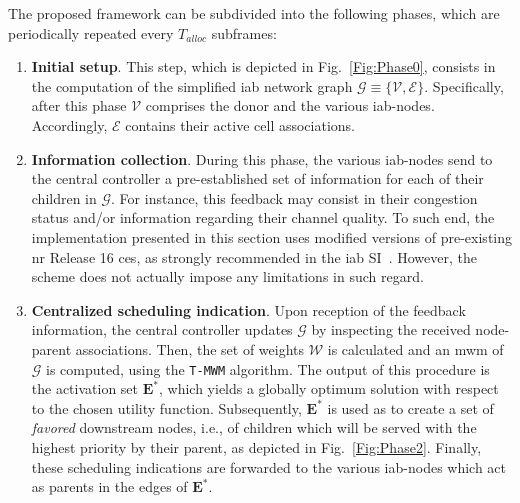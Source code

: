 The proposed framework can be subdivided into the following phases, which are periodically repeated every $T_{alloc}$ subframes:
\begin{enumerate}
\item \label{Enum_frameword:item_one} \textbf{Initial setup}. This step, which is depicted in Fig.~\ref{Fig:Phase0}, consists in the computation of the simplified \gls{iab} network graph $\mathcal{G} \equiv \{ \mathcal{V}, \mathcal{E} \}$. Specifically, after this phase $\mathcal{V}$ comprises the donor and the various \gls{iab}-nodes. Accordingly, $\mathcal{E}$ contains their active cell associations.

\item \label{Enum_frameword:item_two} \textbf{Information collection}. During this phase, the various \gls{iab}-nodes send to the central controller a pre-established set of information for each of their children in $\mathcal{G}$. For instance, this feedback may consist in their congestion status and/or  information regarding their channel quality. To such end, the implementation presented in this section uses modified versions of pre-existing \gls{nr} Release 16 \glspl{ce}, as strongly recommended in the \gls{iab} SI~\cite{3gpp_38_874}. However, the scheme does not actually impose any limitations in such regard.
\item \label{Enum_frameword:item_three} \textbf{Centralized scheduling indication}. Upon reception of the feedback information, the central controller updates $\mathcal{G}$ by inspecting the received node-parent associations. Then, the set of weights $\mathcal{W}$ is calculated and an \gls{mwm} of $\mathcal{G}$ is computed, using the \texttt{T-MWM} algorithm. The output of this procedure is the activation set $\mathbf{E^*}$, which yields a globally optimum solution with respect to the chosen utility function. Subsequently, $\mathbf{E^*}$ is used as to create a set of \textit{favored} downstream nodes, i.e., of children which will be served with the highest priority by their parent, as depicted in Fig.~\ref{Fig:Phase2}. Finally, these scheduling indications are forwarded to the various \gls{iab}-nodes which act as parents in the edges of $\mathbf{E^*}$.


\end{enumerate}
